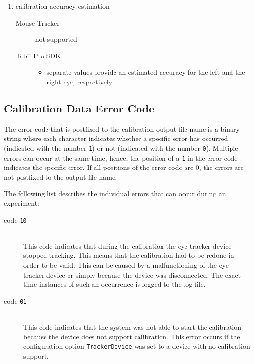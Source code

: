 \documentclass[a4paper,oneside]{book}
\begin{document}
\begin{enumerate}
\begin{description}
        \end{description}
    \item calibration accuracy estimation
        \begin{description}
            \item[Mouse Tracker] not supported
            \item[Tobii Pro SDK] \hfill
                \begin{itemize}
                    \item separate values provide an estimated accuracy for the left and the right eye, respectively
                \end{itemize}
        \end{description}
\end{enumerate}

\subsection{Calibration Data Error Code}
\label{sect.calibration.error}
The error code that is postfixed to the calibration output file name is a binary string where each character indicates whether a specific error has occurred (indicated with the number \texttt{1}) or not (indicated with the number \texttt{0}).
Multiple errors can occur at the same time, hence, the position of a \texttt{1} in the error code indicates the specific error.
If all positions of the error code are 0, the errors are not postfixed to the output file name.

The following list describes the individual errors that can occur during an experiment:
\begin{description}
    \item[code \texttt{10}] \hfill \\
        This code indicates that during the calibration the eye tracker device stopped tracking.
        This means that the calibration had to be redone in order to be valid.
        This can be caused by a malfunctioning of the eye tracker device or simply because the device was disconnected.
        The exact time instances of such an occurrence is logged to the log file.
    \item[code \texttt{01}] \hfill \\
        This code indicates that the system was not able to start the calibration because the device does not support calibration.
        This error occurs if the configuration option \texttt{TrackerDevice} was set to a device with no calibration support.
\end{description}
\end{document}
